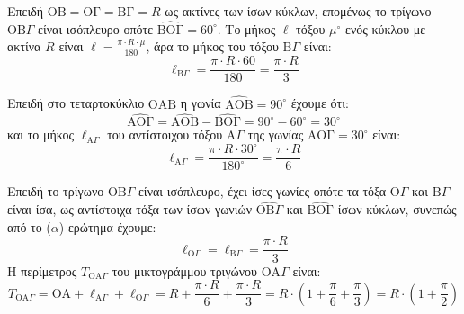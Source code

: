 \begin{alist}
\item Επειδή $\text{OB} = \text{OΓ} = \text{BΓ} = R$ ως ακτίνες των ίσων κύκλων, επομένως το τρίγωνο $\text{OB}\Gamma$ είναι ισόπλευρο οπότε $\widehat{\text{BΟΓ}} = 60^\circ$.
Το μήκος $\ell$ τόξου $\mu^\circ$ ενός κύκλου με ακτίνα $R$ είναι $\ell = \frac{\pi \cdot R \cdot \mu}{180}$, άρα το μήκος του τόξου $\text{B}\Gamma$ είναι:
\[ \ell_{\text{B}\Gamma} = \frac{\pi \cdot R \cdot 60}{180} = \frac{\pi \cdot R}{3} \]

\item Επειδή στο τεταρτοκύκλιο $\text{OAB}$ η γωνία $\widehat{\text{AOB}} = 90^\circ$ έχουμε ότι:
\[ \widehat{\text{AΟΓ}} = \widehat{\text{AOB}}-\widehat{\text{BΟΓ}} = 90^\circ - 60^\circ = 30^\circ \]
και το μήκος $\ell_{\text{A}\Gamma}$ του αντίστοιχου τόξου $\text{A}\Gamma$ της γωνίας $\text{AΟΓ} = 30^\circ$ είναι:
\[ \ell_{\text{A}\Gamma} = \frac{\pi \cdot R \cdot 30^\circ}{180^\circ} = \frac{\pi \cdot R}{6} \]

\item Επειδή το τρίγωνο $\text{OB}\Gamma$ είναι ισόπλευρο, έχει ίσες γωνίες οπότε τα τόξα $\text{O}\Gamma$ και $\text{B}\Gamma$ είναι ίσα, ως αντίστοιχα τόξα των ίσων γωνιών $\widehat{\text{OB}\Gamma}$ και $\widehat{\text{BΟΓ}}$ ίσων κύκλων, συνεπώς από το ($\alpha$) ερώτημα έχουμε:
\[ \ell_{\text{O}\Gamma} = \ell_{\text{B}\Gamma} = \frac{\pi \cdot R}{3} \]
Η περίμετρος $T_{\text{OA}\Gamma}$ του μικτογράμμου τριγώνου $\text{OA}\Gamma$ είναι:
\[ T_{\text{OA}\Gamma} = \text{OA} + \ell_{\text{A}\Gamma} + \ell_{\text{O}\Gamma} = R + \frac{\pi \cdot R}{6} + \frac{\pi \cdot R}{3} = R \cdot \left(1 + \frac{\pi}{6} + \frac{\pi}{3}\right) = R \cdot \left(1 + \frac{\pi}{2}\right) \]
\end{alist}